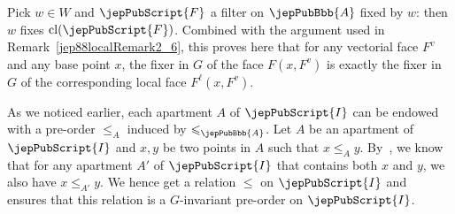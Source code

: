 \begin{remark}\label{jep88localRemark2_7}
Pick $w\in W$ and $\jepPubScript{F}$ a filter on $\jepPubBbb{A}$ fixed by $w$: then $w$ fixes $\operatorname{cl}(\jepPubScript{F})$. Combined with the argument used in Remark~\ref{jep88localRemark2_6}, this proves here that for any vectorial face $F^v$ and any base point $x$, the fixer in $G$ of the face $F(x,F^v)$ is exactly the fixer in $G$ of the corresponding local face $F^\ell(x,F^v)$.
\end{remark}
\begin{remark}\label{jep88localRemark2_8}
As we noticed earlier, each apartment $A$ of $\jepPubScript{I}$ can be endowed with a pre-order $\leqslant_A$ induced by $\leqslant_{\jepPubBbb{A}}$. Let $A$ be an apartment of $\jepPubScript{I}$ and $x,y$ be two points in $A$ such that $x\leqslant_A y$. By~\cite[Prop.~5.4]{jep88refRou11}, we know that for any apartment $A'$ of $\jepPubScript{I}$ that contains both $x$ and $y$, we also have $x\leqslant_{A'}y$. We hence get a relation $\leqslant$ on $\jepPubScript{I}$ and~\cite[Th.~5.9]{jep88refRou11} ensures that this relation is a $G$-invariant pre-order on $\jepPubScript{I}$.
\end{remark}
